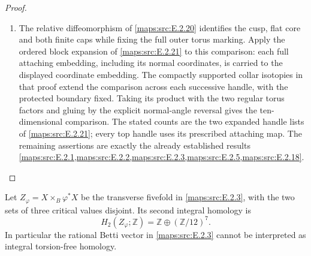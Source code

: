 \begin{proof}
\begin{enumerate}[label=\arabic*.,leftmargin=*]
\item The relative diffeomorphism of \cref{maps:src:E.2.20} identifies the cusp, flat core and both finite caps while fixing the full outer torus marking. Apply the ordered block expansion of \cref{maps:src:E.2.21} to this comparison: each full attaching embedding, including its normal coordinates, is carried to the displayed coordinate embedding. The compactly supported collar isotopies in that proof extend the comparison across each successive handle, with the protected boundary fixed. Taking its product with the two regular torus factors and gluing by the explicit normal-angle reversal gives the ten-dimensional comparison. The stated counts are the two expanded handle lists of \cref{maps:src:E.2.21}; every top handle uses its prescribed attaching map. The remaining assertions are exactly the already established results \cref{maps:src:E.2.1,maps:src:E.2.2,maps:src:E.2.3,maps:src:E.2.5,maps:src:E.2.18}.
\end{enumerate}
\end{proof}



\begin{proposition}\label{maps:src:E.2.5}


Let \(Z_\varphi=X\times_B\varphi^*X\) be the transverse
fivefold in \ref{maps:src:E.2.3}, with the two sets of three critical values
disjoint. Its second integral homology is
\[
 H_2(Z_\varphi;\mathbb Z)
   =\mathbb Z\oplus(\mathbb Z/12)^7.
\]
In particular the rational Betti vector in \ref{maps:src:E.2.3} cannot be
interpreted as integral torsion-free homology.
\end{proposition}


